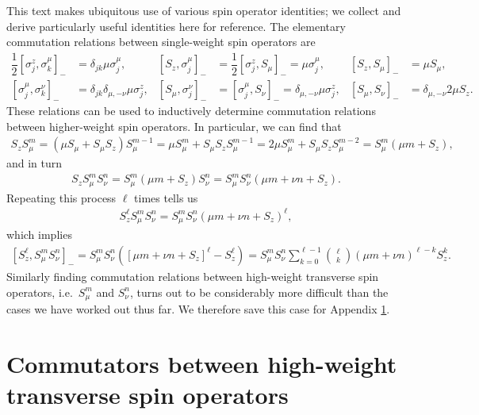 \documentclass[aps,notitlepage,nofootinbib,11pt]{revtex4-1}
\newcommand{\f}[2]{\dfrac{#1}{#2}} %
\newcommand{\p}[1]{\left(#1\right)} %
\renewcommand{\sp}[1]{\left[#1\right]} %
\newcommand{\1}{\mathds{1}}
\begin{document}
This text makes ubiquitous use of various spin operator identities; we
collect and derive particularly useful identities here for reference.
The elementary commutation relations between single-weight spin
operators are
\begin{align}
  \f12 \sp{\sigma_j^z,\sigma_k^\mu}_-
  &= \delta_{jk} \mu \sigma_j^\mu,
  &
  \sp{S_z,\sigma_j^\mu}_-
  &= \f12 \sp{\sigma_j^z,S_\mu}_- = \mu \sigma_j^\mu,
  &
  \sp{S_z,S_\mu}_-
  &= \mu S_\mu,
  \label{eq:comm_z_mu} \\
  \sp{\sigma_j^\mu,\sigma_k^\nu}_-
  &= \delta_{jk} \delta_{\mu,-\nu} \mu \sigma_j^z,
  &
  \sp{S_\mu,\sigma_j^\nu}_-
  &= \sp{\sigma_j^\mu,S_\nu}_-
  = \delta_{\mu,-\nu} \mu \sigma_j^z,
  &
  \sp{S_\mu,S_\nu}_-
  &= \delta_{\mu,-\nu} 2 \mu S_z.
  \label{eq:comm_mu_nu}
\end{align}
These relations can be used to inductively determine commutation
relations between higher-weight spin operators.  In particular, we can
find that
\begin{align}
  S_z S_\mu^m
  = \p{\mu S_\mu + S_\mu S_z} S_\mu^{m-1}
  = \mu S_\mu^m + S_\mu S_z S_\mu^{m-1}
  = 2 \mu S_\mu^m + S_\mu S_z S_\mu^{m-2}
  = S_\mu^m \p{\mu m + S_z},
  \label{eq:push_z_mu}
\end{align}
and in turn
\begin{align}
  S_z S_\mu^m S_\nu^n
  = S_\mu^m \p{\mu m + S_z} S_\nu^n
  = S_\mu^m S_\nu^n \p{\mu m + \nu n + S_z}.
  \label{eq:push_z_mu_nu}
\end{align}
Repeating this process $\ell$ times tells us
\begin{align}
  S_z^\ell S_\mu^m S_\nu^n
  = S_\mu^m S_\nu^n \p{\mu m + \nu n + S_z}^\ell,
\end{align}
which implies
\begin{align}
  \sp{S_z^\ell, S_\mu^m S_\nu^n}_-
  = S_\mu^m S_\nu^n \p{\sp{\mu m + \nu n + S_z}^\ell - S_z^\ell}
  = S_\mu^m S_\nu^n  \sum_{k=0}^{\ell-1} {\ell \choose k}
  \p{\mu m + \nu n}^{\ell-k} S_z^k.
  \label{eq:comm_z_mu_nu_pow}
\end{align}
Similarly finding commutation relations between high-weight transverse
spin operators, i.e.~$S_\mu^m$ and $S_\nu^n$, turns out to be
considerably more difficult than the cases we have worked out thus
far.  We therefore save this case for Appendix
\ref{sec:comm_transverse}.


\newpage
\section{Commutators between high-weight transverse spin operators}
\label{sec:comm_transverse}
\end{document}
